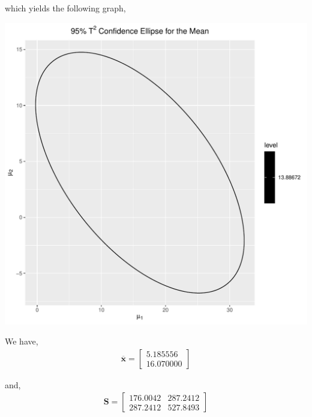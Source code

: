 \documentclass[12pt]{article}\usepackage[]{graphicx}\usepackage[]{color}
\makeatletter
\def\maxwidth{ %
  \ifdim\Gin@nat@width>\linewidth
    \linewidth
  \else
    \Gin@nat@width
  \fi
}
\newenvironment{knitrout}{}{} %
\newenvironment{problem}[2][Problem]{\begin{trivlist}
\item[\hskip \labelsep {\bfseries #1}\hskip \labelsep {\bfseries #2.}]}{\end{trivlist}}
\newcommand{\vct}{\mathbf}
\makeatother
\begin{document}
which yields the following graph,

\begin{knitrout}
\color{fgcolor}
\includegraphics[width=\maxwidth]{figure/unnamed-chunk-2-1} 

\end{knitrout}


\newpage
\begin{problem}{5.11(a)}
\end{problem}

We have,
\begin{align*}
\vct{\overline{x}} = \begin{bmatrix} 5.185556 \\ 16.070000 \end{bmatrix}
\end{align*}

and,
\begin{align*}
\vct{S} = \begin{bmatrix} 176.0042 & 287.2412 \\ 287.2412 & 527.8493 \end{bmatrix}
\end{align*}
\end{document}
